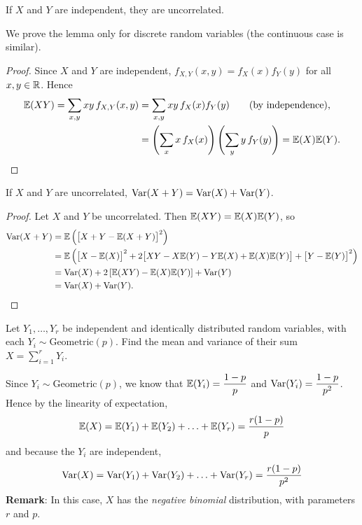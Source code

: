 \begin{lemma}
If $X$ and $Y$ are independent, they are uncorrelated.%
\end{lemma}

We prove the lemma only for discrete random variables (the continuous case is similar).
\vspace{0ex}
\begin{proof}
Since $X$ and $Y$ are independent, $f_{X,Y}(x,y)=f_X(x)f_Y(y)$ for all $x,y\in\mathbb{R}$. Hence
\begin{align*}
\mathbb{E}(XY) = \sum_{x,y} xy\, f_{X,Y}(x,y)
	& = \sum_{x,y} xy\, f_X(x)f_Y(y) \text{\qquad(by independence),}\\
	& = \left(\sum_x x\, f_X(x)\right)\left(\sum_y y\, f_Y(y)\right)
	= \mathbb{E}(X)\mathbb{E}(Y).
\end{align*}
\end{proof}

\begin{theorem}
If $X$ and $Y$ are uncorrelated, $\text{Var}(X+Y) = \text{Var}(X) + \text{Var}(Y)$.
\end{theorem}

\begin{proof}
Let $X$ and $Y$ be uncorrelated. Then $\mathbb{E}(XY)=\mathbb{E}(X)\mathbb{E}(Y)$, so
\begin{align*}
\text{Var}(X+Y)	& = \mathbb{E}\left(\big[X+Y - \mathbb{E}(X+Y)\big]^2\right) \\
			& = \mathbb{E}\left(\big[X-\mathbb{E}(X)\big]^2 + 2\big[XY - X\mathbb{E}(Y) - Y\mathbb{E}(X) + \mathbb{E}(X)\mathbb{E}(Y)\big] + \big[Y-\mathbb{E}(Y)\big]^2\right) \\
			& = \text{Var}(X) + 2\left[\mathbb{E}(XY)-\mathbb{E}(X)\mathbb{E}(Y)\right] + \text{Var}(Y) \\
			& = \text{Var}(X) + \text{Var}(Y).
\end{align*}
\end{proof}



\begin{example}
Let $Y_1,\ldots,Y_r$ be independent and identically distributed random variables, with each $Y_i\sim\text{Geometric}(p)$. Find the mean and variance of their sum $X = \sum_{i=1}^r Y_i$.
\begin{solution}
Since $Y_i\sim\text{Geometric}(p)$, we know that $\mathbb{E}(Y_i)=\displaystyle\frac{1-p}{p}$ and $\text{Var}(Y_i)=\displaystyle\frac{1-p}{p^2}$. Hence by the linearity of expectation,
\[
\mathbb{E}(X) = \mathbb{E}(Y_1)+\mathbb{E}(Y_2)+\ldots+\mathbb{E}(Y_r) = \frac{r(1-p)}{p}
\]
and because the $Y_i$ are independent,
\[
\text{Var}(X) = \text{Var}(Y_1)+\text{Var}(Y_2)+\ldots+\text{Var}(Y_r) = \frac{r(1-p)}{p^2}
\]
\textbf{Remark}: In this case, $X$ has the \emph{negative binomial} distribution, with parameters $r$ and $p$.
\end{solution}
\end{example}

